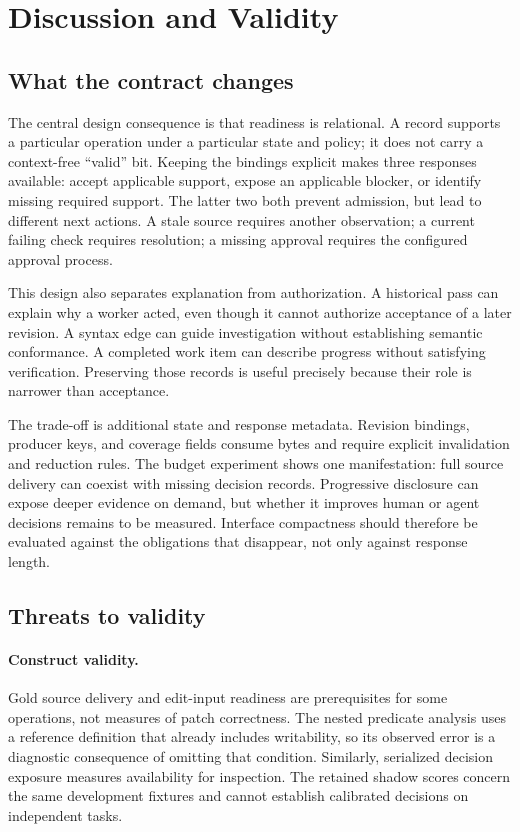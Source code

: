 \section{Discussion and Validity}
\label{sec:discussion}
\subsection{What the contract changes}
The central design consequence is that readiness is relational. A record supports a particular operation under a particular state and policy; it does not carry a context-free ``valid'' bit. Keeping the bindings explicit makes three responses available: accept applicable support, expose an applicable blocker, or identify missing required support. The latter two both prevent admission, but lead to different next actions. A stale source requires another observation; a current failing check requires resolution; a missing approval requires the configured approval process.

This design also separates explanation from authorization. A historical pass can explain why a worker acted, even though it cannot authorize acceptance of a later revision. A syntax edge can guide investigation without establishing semantic conformance. A completed work item can describe progress without satisfying verification. Preserving those records is useful precisely because their role is narrower than acceptance.

The trade-off is additional state and response metadata. Revision bindings, producer keys, and coverage fields consume bytes and require explicit invalidation and reduction rules. The budget experiment shows one manifestation: full source delivery can coexist with missing decision records. Progressive disclosure can expose deeper evidence on demand, but whether it improves human or agent decisions remains to be measured. Interface compactness should therefore be evaluated against the obligations that disappear, not only against response length.

\subsection{Threats to validity}
\paragraph{Construct validity.}
Gold source delivery and edit-input readiness are prerequisites for some operations, not measures of patch correctness. The nested predicate analysis uses a reference definition that already includes writability, so its observed error is a diagnostic consequence of omitting that condition. Similarly, serialized decision exposure measures availability for inspection. The retained shadow scores concern the same development fixtures and cannot establish calibrated decisions on independent tasks.

